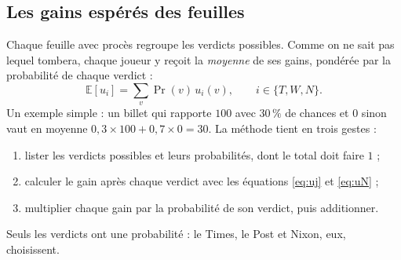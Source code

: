 \documentclass[11pt,a4paper]{article}
\theoremstyle{definition}
\newcommand{\E}{\mathbb{E}}
\begin{document}
\subsection{Les gains espérés des feuilles}
Chaque feuille avec procès regroupe les verdicts possibles. Comme on ne sait pas lequel tombera, chaque joueur y reçoit la \emph{moyenne} de ses gains, pondérée par la probabilité de chaque verdict :
\begin{equation}
\E[u_i]=\sum_{v}\Pr(v)\,u_i(v),\qquad i\in\{T,W,N\}. \label{eq:esp}
\end{equation}
Un exemple simple : un billet qui rapporte $100$ avec $30\,\%$ de chances et $0$ sinon vaut en moyenne $0,3\times100+0,7\times0=30$. La méthode tient en trois gestes :
\begin{enumerate}[leftmargin=*,itemsep=0pt,topsep=2pt]
\item lister les verdicts possibles et leurs probabilités, dont le total doit faire $1$ ;
\item calculer le gain après chaque verdict avec les équations \eqref{eq:uj} et \eqref{eq:uN} ;
\item multiplier chaque gain par la probabilité de son verdict, puis additionner.
\end{enumerate}
Seuls les verdicts ont une probabilité : le Times, le Post et Nixon, eux, choisissent.
\end{document}
